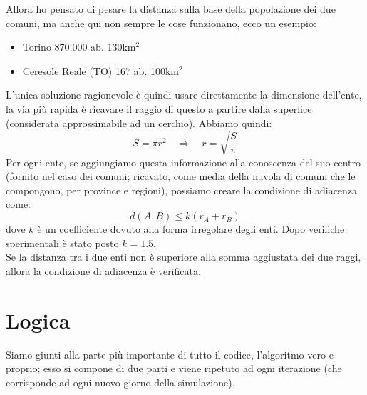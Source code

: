 \documentclass[a4paper, 12pt]{article}
\begin{document}
		Allora ho pensato di pesare la distanza sulla base della popolazione dei due comuni, ma anche qui non sempre le cose funzionano, ecco un esempio:
		\begin{itemize}
			\item Torino	\hfill 870.000 ab. \hspace{3cm} 130km$^{2}$
			\item Ceresole Reale (TO)	\hfill 167 ab. \hspace{3cm} 100km$^{2}$
		\end{itemize}
		L'unica soluzione ragionevole è quindi usare direttamente la dimensione dell'ente, la via più rapida è ricavare il raggio di questo a partire dalla superfice (considerata approssimabile ad un cerchio). Abbiamo quindi:
		\begin{equation}
			S = \pi r^{2} 	\quad \Rightarrow \quad r = \sqrt{\frac{S}{\pi}}
		\end{equation}
		Per ogni ente, se aggiungiamo questa informazione alla conoscenza del suo centro (fornito nel caso dei comuni; ricavato, come media della nuvola di comuni che le compongono, per province e regioni), possiamo creare la condizione di adiacenza come:
		\begin{equation}
		d (A, B) \le k(r_{A}+r_{B})  
		\end{equation}
		dove $k$ è un coefficiente dovuto alla forma irregolare degli enti. Dopo verifiche sperimentali è stato posto $k = 1.5$.\\
		Se la distanza tra i due enti non è superiore alla somma aggiustata dei due raggi, allora la condizione di adiacenza è verificata.

\newpage

\section{Logica}
	\label{sec:log}
	Siamo giunti alla parte più importante di tutto il codice, l'algoritmo vero e proprio;
	esso si compone di due parti e viene ripetuto ad ogni iterazione (che corrisponde ad ogni nuovo giorno della simulazione).
	
\end{document}
